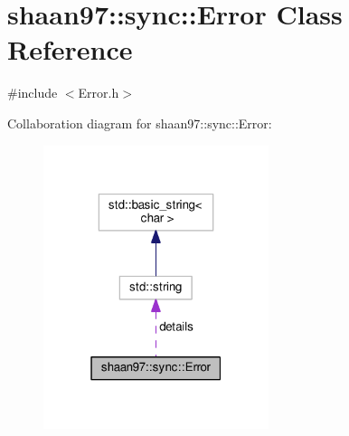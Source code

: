 \hypertarget{classshaan97_1_1sync_1_1_error}{}\section{shaan97\+:\+:sync\+:\+:Error Class Reference}
\label{classshaan97_1_1sync_1_1_error}


{\ttfamily \#include $<$Error.\+h$>$}



Collaboration diagram for shaan97\+:\+:sync\+:\+:Error\+:\nopagebreak
\begin{figure}[H]
\begin{center}
\leavevmode
\includegraphics[width=187pt]{classshaan97_1_1sync_1_1_error__coll__graph}
\end{center}
\end{figure}
